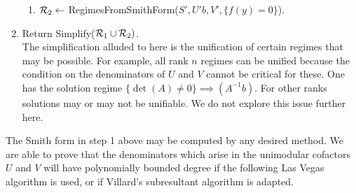 \documentclass[10pt]{article}
\begin{document}
\begin{enumerate}
\begin{enumerate}
\item
${\cal R}_2 \leftarrow$ RegimesFromSmithForm($S', U'b, V', \{f(y) = 0\}$).
\end{enumerate}
\item
Return Simplify(${\cal R}_1 \cup {\cal R}_2)$.\\
\bc
The simplification alluded to here is the unification of certain regimes that
may be possible.  For example, all rank $n$ regimes can be unified because 
the condition on the denominators of $U$ and $V$ cannot be critical for these.
One has the solution regime $\{\det(A) \neq 0\}\implies (A^{-1}b)$.  For other 
ranks solutions may or may not be unifiable.  We do not explore this issue 
further here. \ec
\end{enumerate}

\newpage
The Smith form in step 1 above may be computed by any desired method.  We are able to 
prove that the denominators which arise in the unimodular cofactors $U$ and $V$ will
have polynomially bounded degree if the following Las Vegas algorithm is used, or if 
Villard's subresultant algorithm \cite{Vil,Lab} is adapted.
\end{document}
